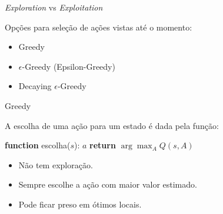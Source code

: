\documentclass{beamer}
\begin{document}
\begin{frame}{\textit{Exploration} vs \textit{Exploitation}}

	Opções para seleção de ações vistas até o momento: 

	\begin{itemize}
		\item Greedy 
		\item $\epsilon$-Greedy (Epsilon-Greedy)
		\item Decaying $\epsilon$-Greedy
	\end{itemize}
\end{frame}


%		
%		
%		

\begin{frame}{Greedy}
	
	A escolha de uma ação para um estado é dada pela função:
	
	\vspace{0.3cm}
	
	\begin{algorithmic} 
		\STATE \textbf{function} escolha($s$): $a$
		\STATE \hspace*{\algorithmicindent} \textbf{return} $\arg \max_{A}{Q(s, A)}$
	\end{algorithmic}
	
	\vspace{0.3cm}
	
	\begin{itemize}
		\item Não tem exploração. 
		\item Sempre escolhe a ação com maior valor estimado. 
		\item Pode ficar preso em ótimos locais. 
	\end{itemize}
	
\end{frame}
\end{document}
